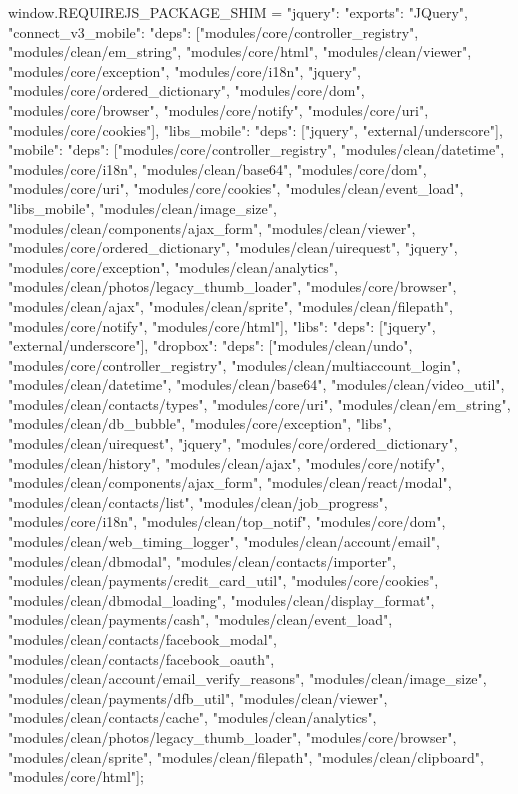 {                        window.REQUIREJS_PACKAGE_SHIM = {"jquery": {"exports": "JQuery"}, "connect_v3_mobile": {"deps": ["modules/core/controller_registry", "modules/clean/em_string", "modules/core/html", "modules/clean/viewer", "modules/core/exception", "modules/core/i18n", "jquery", "modules/core/ordered_dictionary", "modules/core/dom", "modules/core/browser", "modules/core/notify", "modules/core/uri", "modules/core/cookies"]}, "libs_mobile": {"deps": ["jquery", "external/underscore"]}, "mobile": {"deps": ["modules/core/controller_registry", "modules/clean/datetime", "modules/core/i18n", "modules/clean/base64", "modules/core/dom", "modules/core/uri", "modules/core/cookies", "modules/clean/event_load", "libs_mobile", "modules/clean/image_size", "modules/clean/components/ajax_form", "modules/clean/viewer", "modules/core/ordered_dictionary", "modules/clean/uirequest", "jquery", "modules/core/exception", "modules/clean/analytics", "modules/clean/photos/legacy_thumb_loader", "modules/core/browser", "modules/clean/ajax", "modules/clean/sprite", "modules/clean/filepath", "modules/core/notify", "modules/core/html"]}, "libs": {"deps": ["jquery", "external/underscore"]}, "dropbox": {"deps": ["modules/clean/undo", "modules/core/controller_registry", "modules/clean/multiaccount_login", "modules/clean/datetime", "modules/clean/base64", "modules/clean/video_util", "modules/clean/contacts/types", "modules/core/uri", "modules/clean/em_string", "modules/clean/db_bubble", "modules/core/exception", "libs", "modules/clean/uirequest", "jquery", "modules/core/ordered_dictionary", "modules/clean/history", "modules/clean/ajax", "modules/core/notify", "modules/clean/components/ajax_form", "modules/clean/react/modal", "modules/clean/contacts/list", "modules/clean/job_progress", "modules/core/i18n", "modules/clean/top_notif", "modules/core/dom", "modules/clean/web_timing_logger", "modules/clean/account/email", "modules/clean/dbmodal", "modules/clean/contacts/importer", "modules/clean/payments/credit_card_util", "modules/core/cookies", "modules/clean/dbmodal_loading", "modules/clean/display_format", "modules/clean/payments/cash", "modules/clean/event_load", "modules/clean/contacts/facebook_modal", "modules/clean/contacts/facebook_oauth", "modules/clean/account/email_verify_reasons", "modules/clean/image_size", "modules/clean/payments/dfb_util", "modules/clean/viewer", "modules/clean/contacts/cache", "modules/clean/analytics", "modules/clean/photos/legacy_thumb_loader", "modules/core/browser", "modules/clean/sprite", "modules/clean/filepath", "modules/clean/clipboard", "modules/core/html"]}};
}
